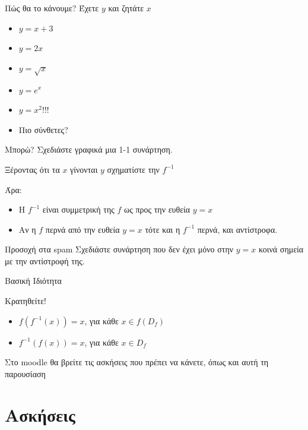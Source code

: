 \documentclass{presentation}
\begin{document}
\begin{frame}{Πώς θα το κάνουμε?}
  Έχετε $y$ και ζητάτε $x$ \pause
  \begin{itemize}
    \item $y=x+3$ \pause
    \item $y=2x$ \pause
    \item $y=\sqrt{x}$ \pause
    \item $y=e^x$ \pause
    \item $y=x^2$!!! \pause
    \item Πιο σύνθετες?
  \end{itemize}
\end{frame}

\begin{frame}{Μπορώ?}
  Σχεδιάστε γραφικά μια 1-1 συνάρτηση. \pause

  Ξέροντας ότι τα $x$ γίνονται $y$ σχηματίστε την $f^{-1}$ \pause

  Άρα:
  \begin{itemize}
    \item Η $f^{-1}$ είναι συμμετρική της $f$ ως προς την ευθεία $y=x$ \pause
    \item Αν η $f$ περνά από την ευθεία $y=x$ τότε και η $f^{-1}$ περνά, και αντίστροφα.
  \end{itemize} \pause
  \begin{alertblock}{Προσοχή στα spam}
    Σχεδιάστε συνάρτηση που δεν έχει μόνο στην $y=x$ κοινά σημεία με την αντίστροφή της.
  \end{alertblock}
\end{frame}

\begin{frame}{Βασική Ιδιότητα}
  \begin{exampleblock}{Κρατηθείτε!}
    \begin{itemize}
      \item $f\left(f^{-1}(x)\right)=x$, για κάθε $x\in f(D_f)$ \pause
      \item $f^{-1}\left(f(x)\right)=x$, για κάθε $x\in D_f$
    \end{itemize}
  \end{exampleblock}
\end{frame}

\begin{frame}[noframenumbering]
  Στο moodle θα βρείτε τις ασκήσεις που πρέπει να κάνετε, όπως και αυτή τη παρουσίαση
\end{frame}

\section{Ασκήσεις}
\end{document}
